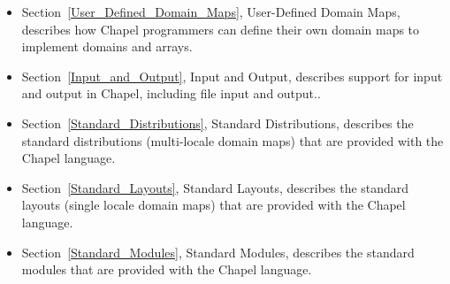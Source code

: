 \begin{itemize}
\item
Section~\ref{User_Defined_Domain_Maps}, User-Defined Domain Maps,
describes how Chapel programmers can define their own domain maps to
implement domains and arrays.

\item
Section~\ref{Input_and_Output}, Input and Output, describes support
for input and output in Chapel, including file input and output..

\item
Section~\ref{Standard_Distributions}, Standard Distributions,
describes the standard distributions (multi-locale domain maps) that
are provided with the Chapel language.

\item
Section~\ref{Standard_Layouts}, Standard Layouts, describes the
standard layouts (single locale domain maps) that are provided with
the Chapel language.

\item
Section~\ref{Standard_Modules}, Standard Modules, describes the
standard modules that are provided with the Chapel language.

\end{itemize}
